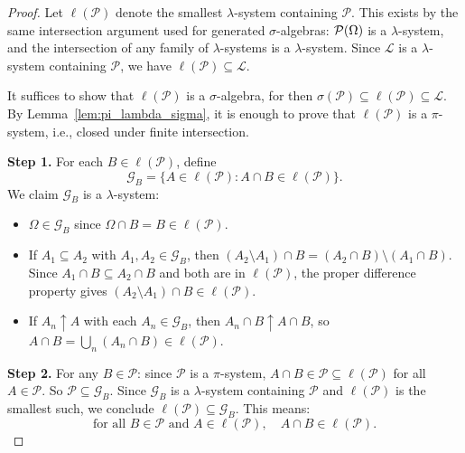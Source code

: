 \documentclass[11pt,a4paper]{article}
\begin{document}
\begin{proof}
Let $\ell(\mathcal{P})$ denote the smallest $\lambda$-system containing
$\mathcal{P}$. This exists by the same intersection argument used for
generated $\sigma$-algebras: $\mathcal{P}(\Omega)$ is a $\lambda$-system,
and the intersection of any family of $\lambda$-systems is a
$\lambda$-system. Since $\mathcal{L}$ is a $\lambda$-system containing
$\mathcal{P}$, we have $\ell(\mathcal{P}) \subseteq \mathcal{L}$.

It suffices to show that $\ell(\mathcal{P})$ is a $\sigma$-algebra, for
then $\sigma(\mathcal{P}) \subseteq \ell(\mathcal{P}) \subseteq
\mathcal{L}$. By Lemma~\ref{lem:pi_lambda_sigma}, it is enough to prove
that $\ell(\mathcal{P})$ is a $\pi$-system, i.e., closed under finite
intersection.

\textbf{Step 1.} For each $B \in \ell(\mathcal{P})$, define
\begin{equation}
  \mathcal{G}_B = \{A \in \ell(\mathcal{P}) :
    A \cap B \in \ell(\mathcal{P})\}.
\end{equation}
We claim $\mathcal{G}_B$ is a $\lambda$-system:
\begin{itemize}[nosep]
  \item $\Omega \in \mathcal{G}_B$ since
    $\Omega \cap B = B \in \ell(\mathcal{P})$.
  \item If $A_1 \subseteq A_2$ with $A_1, A_2 \in \mathcal{G}_B$, then
    $(A_2 \setminus A_1) \cap B = (A_2 \cap B) \setminus (A_1 \cap B)$.
    Since $A_1 \cap B \subseteq A_2 \cap B$ and both are in
    $\ell(\mathcal{P})$, the proper difference property gives
    $(A_2 \setminus A_1) \cap B \in \ell(\mathcal{P})$.
  \item If $A_n \uparrow A$ with each $A_n \in \mathcal{G}_B$, then
    $A_n \cap B \uparrow A \cap B$, so
    $A \cap B = \bigcup_n (A_n \cap B) \in \ell(\mathcal{P})$.
\end{itemize}

\textbf{Step 2.} For any $B \in \mathcal{P}$: since $\mathcal{P}$ is a
$\pi$-system, $A \cap B \in \mathcal{P} \subseteq \ell(\mathcal{P})$
for all $A \in \mathcal{P}$. So $\mathcal{P} \subseteq \mathcal{G}_B$.
Since $\mathcal{G}_B$ is a $\lambda$-system containing $\mathcal{P}$
and $\ell(\mathcal{P})$ is the smallest such, we conclude
$\ell(\mathcal{P}) \subseteq \mathcal{G}_B$. This means:
\begin{equation}
  \text{for all } B \in \mathcal{P} \text{ and }
  A \in \ell(\mathcal{P}),\quad
  A \cap B \in \ell(\mathcal{P}).
  \label{eq:step2}
\end{equation}


\end{proof}
\end{document}
